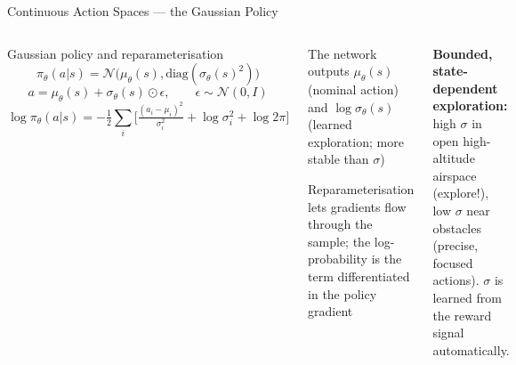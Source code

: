 \documentclass[aspectratio=169,10pt,t]{beamer}
\begin{document}
\begin{frame}{Continuous Action Spaces --- the Gaussian Policy}
\begin{columns}[T]
\begin{fbx}{Gaussian policy and reparameterisation}\[\pi_\theta(a|s)=\mathcal{N}\big(\mu_\theta(s),\text{diag}(\sigma_\theta(s)^2)\big)\]\[a=\mu_\theta(s)+\sigma_\theta(s)\odot\epsilon,\qquad\epsilon\sim\mathcal{N}(0,I)\]\[\log\pi_\theta(a|s)=-\tfrac12\sum_i\Big[\tfrac{(a_i-\mu_i)^2}{\sigma_i^2}+\log\sigma_i^2+\log2\pi\Big]\]\end{fbx}
\begin{tl}\item The network outputs $\mu_\theta(s)$ (nominal action) and $\log\sigma_\theta(s)$ (learned exploration; more stable than $\sigma$)\item Reparameterisation lets gradients flow through the sample; the log-probability is the term differentiated in the policy gradient\end{tl}
\begin{rbox}\scriptsize\textbf{Bounded, state-dependent exploration:} high $\sigma$ in open high-altitude airspace (explore!), low $\sigma$ near obstacles (precise, focused actions). $\sigma$ is learned from the reward signal automatically.\end{rbox}
\end{columns}
\end{frame}
\end{document}
